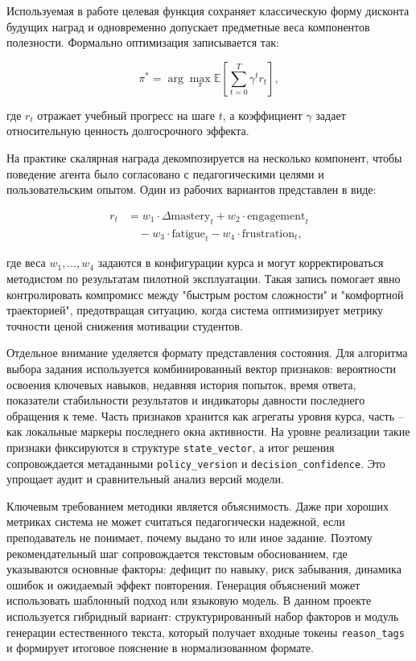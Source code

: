 Используемая в работе целевая функция сохраняет классическую форму дисконта
будущих наград и одновременно допускает предметные веса компонентов полезности.
Формально оптимизация записывается так:

\begin{equation}
  \pi^* = \arg\max_{\pi} \mathbb{E}\left[\sum_{t=0}^{T} \gamma^t r_t\right],
\end{equation}

где $r_t$ отражает учебный прогресс на шаге $t$, а коэффициент $\gamma$ задает
относительную ценность долгосрочного эффекта.

На практике скалярная награда декомпозируется на несколько компонент, чтобы
поведение агента было согласовано с педагогическими целями и пользовательским
опытом. Один из рабочих вариантов представлен в виде:

\begin{equation}
  \begin{aligned}
    r_t & = w_1 \cdot \Delta \mathrm{mastery}_t + w_2 \cdot \mathrm{engagement}_t \\
        & \quad - w_3 \cdot \mathrm{fatigue}_t - w_4 \cdot \mathrm{frustration}_t,
  \end{aligned}
\end{equation}

где веса $w_1,\dots,w_4$ задаются в конфигурации курса и могут корректироваться
методистом по результатам пилотной эксплуатации. Такая запись помогает явно
контролировать компромисс между "быстрым ростом сложности" и "комфортной
траекторией", предотвращая ситуацию, когда система оптимизирует метрику
точности ценой снижения мотивации студентов.

Отдельное внимание уделяется формату представления состояния. Для алгоритма
выбора задания используется комбинированный вектор признаков: вероятности
освоения ключевых навыков, недавняя история попыток, время ответа, показатели
стабильности результатов и индикаторы давности последнего обращения к теме.
Часть признаков хранится как агрегаты уровня курса, часть -- как локальные
маркеры последнего окна активности. На уровне реализации такие признаки
фиксируются в структуре \texttt{state\_vector}, а итог решения сопровождается
метаданными \texttt{policy\_version} и \texttt{decision\_confidence}. Это
упрощает аудит и сравнительный анализ версий модели.

Ключевым требованием методики является объяснимость. Даже при хороших метриках
система не может считаться педагогически надежной, если преподаватель не
понимает, почему выдано то или иное задание. Поэтому рекомендательный шаг
сопровождается текстовым обоснованием, где указываются основные факторы:
дефицит по навыку, риск забывания, динамика ошибок и ожидаемый эффект
повторения. Генерация объяснений может использовать шаблонный подход или
языковую модель. В данном проекте используется гибридный вариант:
структурированный набор факторов и модуль генерации естественного текста,
который получает входные токены \texttt{reason\_tags} и формирует итоговое
пояснение в нормализованном формате.


